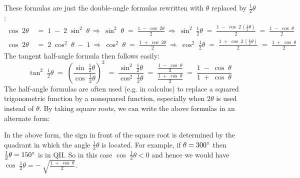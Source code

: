 \noindent These formulas are just the double-angle formulas rewritten with $\theta$ replaced by
$\tfrac{1}{2}\theta$:
\begin{align*}
 \cos\;2\theta \;&=\; 1 \;-\; 2\;\sin^2 \;\theta ~\Rightarrow~ \sin^2 \;\theta \;=\; \frac{1 \;-\; \cos\;2\theta}{2}
  ~\Rightarrow~ \sin^2 \;\tfrac{1}{2}\theta \;=\; \frac{1 \;-\; \cos\;2\,(\tfrac{1}{2}\theta)}{2} \;=\;
  \frac{1 \;-\; \cos\;\theta}{2}\\
 \cos\;2\theta \;&=\; 2\;\cos^2  \;\theta\;-\; 1 ~\Rightarrow~ \cos^2 \;\theta \;=\; \frac{1 \;+\; \cos\;2\theta}{2}
  ~\Rightarrow~ \cos^2 \;\tfrac{1}{2}\theta \;=\; \frac{1 \;+\; \cos\;2\,(\tfrac{1}{2}\theta)}{2} \;=\;
  \frac{1 \;+\; \cos\;\theta}{2}
\end{align*}
The tangent half-angle formula then follows easily:
\begin{displaymath}
 \tan^2 \;\tfrac{1}{2}\theta \;=\; \left( \dfrac{\sin\;\tfrac{1}{2}\theta}{\cos\;\tfrac{1}{2}\theta} \right)^2
  \;=\; \dfrac{\sin^2 \;\tfrac{1}{2}\theta}{\cos^2 \;\tfrac{1}{2}\theta} \;=\;
  \dfrac{\tfrac{1 \;-\; \cos\;\theta}{2}}{\tfrac{1 \;+\; \cos\;\theta}{2}} \;=\;
  \frac{1 \;-\; \cos\;\theta}{1 \;+\; \cos\;\theta}
\end{displaymath}
The half-angle formulas are often used (e.g. in calculus) to replace a squared trigonometric
function by a nonsquared function, especially when $2\theta$ is used instead of $\theta$.
\newpage
By taking square roots, we can write the above formulas in an alternate form:

\begin{center}\end{center}

In the above form, the sign in front of the square root is determined by the quadrant in which
the angle $\tfrac{1}{2}\theta$ is located. For example, if $\theta=300^\circ$ then $\tfrac{1}{2}\theta =
150^\circ$ is in QII. So in this case $\cos\;\tfrac{1}{2}\theta < 0$ and hence we would have
$\cos\;\tfrac{1}{2}\theta = -\;\sqrt{\frac{1 \;+\; \cos\;\theta}{2}}$.

